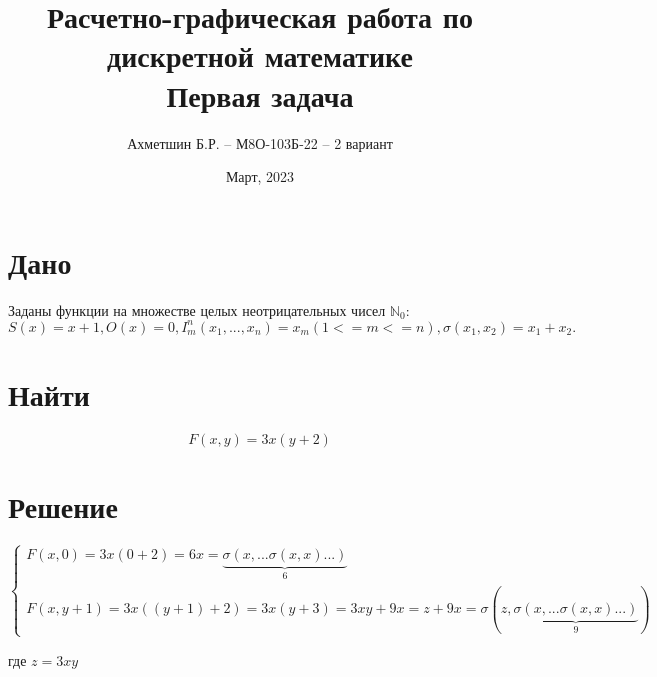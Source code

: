 \documentclass{article}
\title{Расчетно-графическая работа по дискретной математике\\Первая задача}
\author{Ахметшин Б.Р. -- М8О-103Б-22 -- 2 вариант}
\date{Март, 2023}
\begin{document}
\maketitle

\section*{Дано}
Заданы функции на множестве целых неотрицательных чисел $\mathbb{N}_0$:
\[S(x) = x + 1, O(x) = 0, I^n_m(x_1, ..., x_n) = x_m (1 <= m <= n), \sigma(x_1, x_2) = x_1 + x_2.\]
\section*{Найти}
\[F(x,y) = 3x(y+2)\]

\section*{Решение}
\[
\begin{cases}
F(x,0) = 3x(0 + 2) = 6x = \underbrace{\sigma(x, ...\sigma(x, x) ... )}_{6} \\
F(x,y + 1) = 3x((y + 1) + 2) = 3x(y + 3) = 3xy + 9x = z + 9x = \sigma(z, \underbrace{\sigma(x, ... \sigma(x,x)...)}_{9})
\end{cases}
\]


где $z=3xy$
\end{document}
